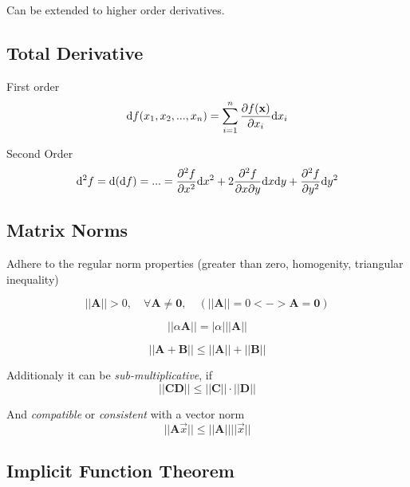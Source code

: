 \documentclass[
    a4paper,
    11pt
]{article}
\begin{document}
Can be extended to higher order derivatives.

\subsection{Total Derivative}

First order
\begin{equation}
    \mathrm{d}f(x_1, x_2, ..., x_n) = \sum_{i=1}^n \pdv{f(\mathbf{x})}{x_i}
    \mathrm{d} x_i
\end{equation}

Second Order
\begin{equation}
    \mathrm{d}^2f = \mathrm{d}(\mathrm{d}f) = ... = \pdv[2]{f}{x} \mathrm{d}x^2 +
    2 \pdv[2]{f}{x}{y} \mathrm{d}x\mathrm{d}y + \pdv[2]{f}{y} \mathrm{d}y^2
\end{equation}

\subsection{Matrix Norms}

Adhere to the regular norm properties (greater than zero, homogenity, triangular
inequality)

\begin{equation}
    ||\mathbf{A}|| > 0, \quad \forall \mathbf{A} \neq \mathbf{0}, \quad
    (||\mathbf{A}|| = 0 <-> \mathbf{A} = \mathbf{0})
\end{equation}

\begin{equation}
    ||\alpha \mathbf{A}|| = |\alpha| ||\mathbf{A}||
\end{equation}

\begin{equation}
    ||\mathbf{A} + \mathbf{B}|| \leq ||\mathbf{A}|| + ||\mathbf{B}||
\end{equation}

Additionaly it can be \textit{sub-multiplicative}, if
\begin{equation}
    ||\mathbf{CD}|| \leq ||\mathbf{C}||\cdot ||\mathbf{D}||
\end{equation}

And \textit{compatible} or \textit{consistent} with a vector norm
\begin{equation}
    ||\mathbf{A} \vec{x}|| \leq ||\mathbf{A}|| ||\vec{x}||
\end{equation}

\subsection{Implicit Function Theorem}
\end{document}
